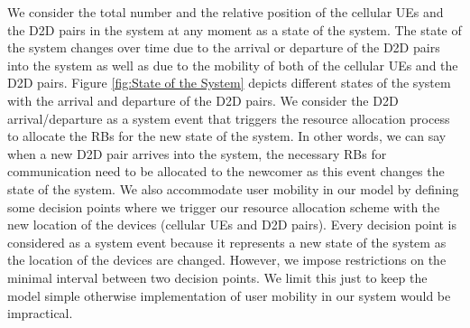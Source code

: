 \documentclass[times]{dacauth}
\begin{document}
\smallskip


\noindent
We consider the total number and the relative position of the cellular UEs and the D2D pairs in the system at any moment as a state of the system. The state of the system changes over time due to the arrival or departure of the D2D pairs into the system as well as due to the mobility of both of the cellular UEs and the D2D pairs. Figure \ref{fig:State of the System} depicts different states of the system with the arrival and departure of the D2D pairs. We consider the D2D arrival/departure as a system event that triggers the resource allocation process to allocate the RBs for the new state of the system. In other words, we can say when a new D2D pair arrives into the system, the necessary RBs for communication need to be allocated to the newcomer as this event changes the state of the system. We also accommodate user mobility in our model by defining some decision points where we trigger our resource allocation scheme with the new location of the devices (cellular UEs and D2D pairs). Every decision point is considered as a system event because it represents a new state of the system as the location of the devices are changed. However, we impose restrictions on the minimal interval between two decision points. We limit this just to keep the model simple otherwise implementation of user mobility in our system would be impractical.
\end{document}

